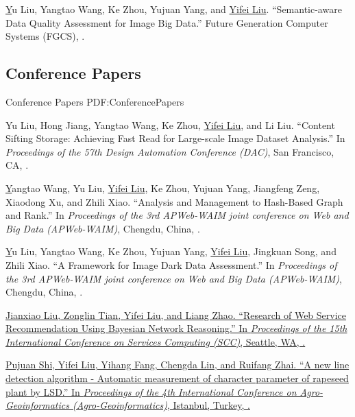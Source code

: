 \documentclass[letterpaper,10pt,oneside]{article}
\begin{document}
\begin{body}
\BigGap
\NumberedItem{[2]}
\href{https://www.sciencedirect.com/science/article/pii/S0167739X19302304}
Yu Liu, Yangtao Wang, Ke Zhou, Yujuan Yang, and \underline{Yifei Liu}.
``Semantic-aware Data Quality Assessment for Image Big Data.'' 
Future Generation Computer Systems (FGCS),
.
\BigGap
\GapNoBreak

\subsection
{Conference Papers}
{Conference Papers}
{PDF:ConferencePapers}
\GapNoBreak

\NumberedItem{[1]}
Yu Liu, Hong Jiang, Yangtao Wang, Ke Zhou, \underline{Yifei Liu}, and Li Liu.
``Content Sifting Storage: Achieving Fast Read for Large-scale Image Dataset Analysis.''
In \textit{Proceedings of the 57th Design Automation Conference (DAC)}, San Francisco, CA,
.

\BigGap
\NumberedItem{[2]}
\href{https://link.springer.com/chapter/10.1007/978-3-030-26072-9_22}
Yangtao Wang, Yu Liu, \underline{Yifei Liu}, Ke Zhou, Yujuan Yang, Jiangfeng Zeng, Xiaodong Xu, and Zhili Xiao.
``Analysis and Management to Hash-Based Graph and Rank.''
In \textit{Proceedings of the 3rd APWeb-WAIM joint conference on Web and Big Data (APWeb-WAIM)}, Chengdu, China,
.

\BigGap
\NumberedItem{[3]}
\href{https://link.springer.com/chapter/10.1007/978-3-030-26072-9_1}
Yu Liu, Yangtao Wang, Ke Zhou, Yujuan Yang, \underline{Yifei Liu}, Jingkuan Song, and Zhili Xiao.
``A Framework for Image Dark Data Assessment.''
In \textit{Proceedings of the 3rd APWeb-WAIM joint conference on Web and Big Data (APWeb-WAIM)}, Chengdu, China,
.

\BigGap
\NumberedItem{[4]}
\href{https://link.springer.com/chapter/10.1007/978-3-319-94376-3_2}
{Jianxiao Liu, Zonglin Tian, \underline{Yifei Liu}, and Liang Zhao.
``Research of Web Service Recommendation Using Bayesian Network Reasoning.''
In \textit{Proceedings of the 15th International Conference on Services Computing (SCC)},
Seattle, WA,
.}

\BigGap
\NumberedItem{[5]}
\href{https://ieeexplore.ieee.org/abstract/document/7248122/}
{Pujuan Shi, \underline{Yifei Liu}, Yihang Fang, Chengda Lin, and Ruifang Zhai.
``A new line detection algorithm - Automatic measurement of character parameter of rapeseed plant by LSD.''
In \textit{Proceedings of the 4th International Conference on Agro-Geoinformatics (Agro-Geoinformatics)},
Istanbul, Turkey,
.}


\end{body}
\end{document}
